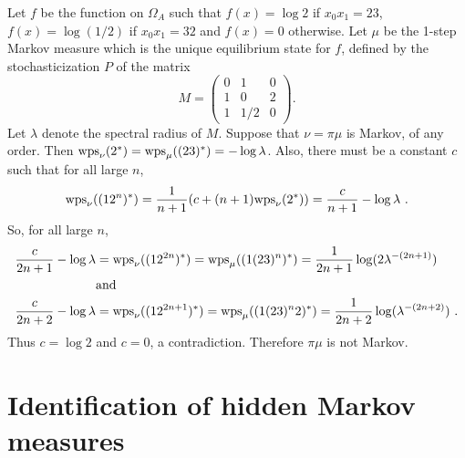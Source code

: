 \documentclass{kepart2010}
\theoremstyle{plain}
\theoremstyle{definition}
\theoremstyle{remark}
\theoremstyle{definition}
\numberwithin{equation}{section}
\begin{document}
\begin{ex}
Let $f$ be the function on
 $\Omega_A$ such that $f(x) = \log 2$ if $x_0x_1=23$,
$f(x) = \log (1/2)$ if $x_0x_1=32$ and $f(x) = 0$ otherwise. Let $\mu$ be
the 1-step Markov measure which is the unique equilibrium state for
$f$, defined by the stochasticization $P$ of the matrix
\begin{equation*}
M =
 \begin{pmatrix}
    0 & 1 & 0\\
    1 & 0 & 2\\
    1 & 1/2 & 0
    \end{pmatrix}.
    \end{equation*}
Let $\lambda$ denote the spectral radius
of $M$.
Suppose that $\nu = \pi \mu$ is Markov, of any order.
Then $
\textnormal{wps}_{\nu}(2^*) =
\textnormal{wps}_{\mu}((23)^*) =
-\log \lambda $. Also, there must be a constant
$c$ such that for all large $n$,
\begin{equation}
\textnormal{wps}_{\nu}((12^n)^*) =
\frac 1{n+1}(c + (n+1)\textnormal{wps}_{\nu}(2^*)) =
\frac {c}{n+1} -\log \lambda
\ .
\end{equation}
So,  for all large $n$,
\begin{equation}
\begin{aligned}
\frac {c}{2n+1} - \log \lambda
&= \textnormal{wps}_{\nu}((12^{2n})^*) =
\textnormal{wps}_{\mu}((1(23)^n)^*)
= \frac 1{2n+1}\log (2\lambda^{-(2n+1)})
 \\
 &\text{and}\\
\frac {c}{2n+2}-\log \lambda
&= \textnormal{wps}_{\nu}((12^{2n+1})^*) =
\textnormal{wps}_{\mu}((1(23)^n2)^*) =
\frac {1}{2n+2}\log (\lambda^{-(2n+2)})\ .
\end{aligned}
\end{equation}
Thus $c=\log 2 $ and $c=0$, a contradiction.
Therefore $\pi \mu $ is not Markov.
\end{ex}

\section{Identification of hidden Markov measures}\label{sec_ident}
\end{document}
